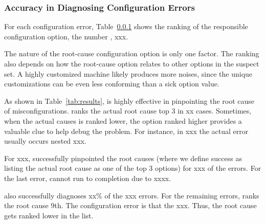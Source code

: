 \begin{table*}[t]
\end{table*}


\subsubsection{Accuracy in Diagnosing Configuration Errors}

For each configuration error, Table~\ref{} shows the ranking of the
responsible configuration option, the number , xxx.

The nature of the root-cause configuration option is only one factor.
The ranking also depends on how the root-cause option relates to
other options in the suspect set. A highly customized machine
likely produces more noises, since the unique customizations
can be even less conforming than a sick option value.

As shown in Table~\ref{tab:results}, \ourtool is highly effective
in pinpointing the root cause of misconfigurations. \ourtool
ranks the actual root cause top 3 in xx cases. Sometimes,
when the actual causes is ranked lower, the option ranked
higher provides a valuable clue to help debug the problem.
For instance, in xxx the actual error usually occurs nested xxx.

For xxx, \ourtool successfully pinpointed the root causes (where
we define success as listing the actual root cause as one of the
top 3 options) for xxx of the errors. For the last error, \ourtool
cannot run to completion due to xxxx.

\ourtool also successfully diagnoses xx\% of the xxx errors. For the
remaining errors, \ourtool ranks the root cause 9th. The configuration
error is that the xxx. Thus, the root cause gets ranked lower
in the list.


